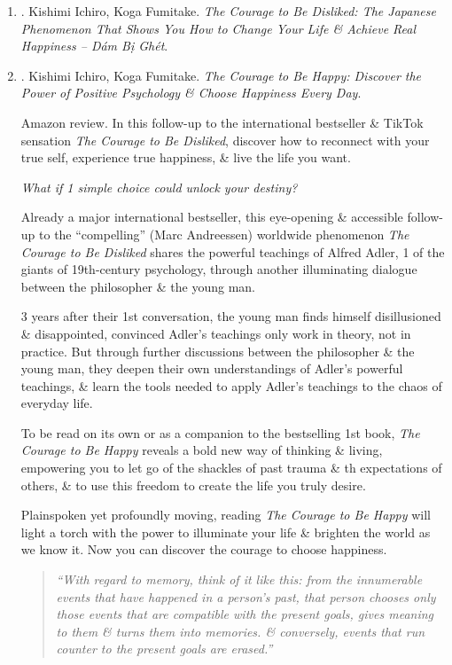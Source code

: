 \documentclass{article}
\begin{document}
\begin{enumerate}
	\item \cite{Ichiro_Fumitake_disliked_VN}. {\sc Kishimi Ichiro, Koga Fumitake}. {\it The Courage to Be Disliked: The Japanese Phenomenon That Shows You How to Change Your Life \& Achieve Real Happiness -- Dám Bị Ghét}.\hfill{\sf[done]}

	\item \cite{Ichiro_Fumitake_happy}. {\sc Kishimi Ichiro, Koga Fumitake}. {\it The Courage to Be Happy: Discover the Power of Positive Psychology \& Choose Happiness Every Day}. {}

	{\sf Amazon review.} In this follow-up to the international bestseller \& TikTok sensation {\it The Courage to Be Disliked}, discover how to reconnect with your true self, experience true happiness, \& live the life you want.

	{\it What if 1 simple choice could unlock your destiny?}

	Already a major international bestseller, this eye-opening \& accessible follow-up to the ``compelling'' ({\sc Marc Andreessen}) worldwide phenomenon {\it The Courage to Be Disliked} shares the powerful teachings of {\sc Alfred Adler}, 1 of the giants of 19th-century psychology, through another illuminating dialogue between the philosopher \& the young man.

	3 years after their 1st conversation, the young man finds himself disillusioned \& disappointed, convinced {\sc Adler}'s teachings only work in theory, not in practice. But through further discussions between the philosopher \& the young man, they deepen their own understandings of {\sc Adler}'s powerful teachings, \& learn the tools needed to apply {\sc Adler}'s teachings to the chaos of everyday life.

	To be read on its own or as a companion to the bestselling 1st book, {\it The Courage to Be Happy} reveals a bold new way of thinking \& living, empowering you to let go of the shackles of past trauma \& th expectations of others, \& to use this freedom to create the life you truly desire.

	Plainspoken yet profoundly moving, reading {\it The Courage to Be Happy} will light a torch with the power to illuminate your life \& brighten the world as we know it. Now you can discover the courage to choose happiness.
	\begin{quotation}
		{\it``With regard to memory, think of it like this: from the innumerable events that have happened in a person's past, that person chooses only those events that are compatible with the present goals, gives meaning to them \& turns them into memories. \& conversely, events that run counter to the present goals are erased.''}


\end{quotation}
\end{enumerate}
\end{document}
